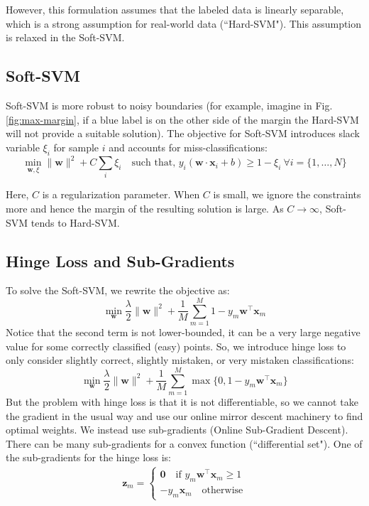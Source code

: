\documentclass[11pt]{article}
\begin{document}
However, this formulation assumes that the labeled data is linearly separable, which is a
strong assumption for real-world data (``Hard-SVM"). This assumption is relaxed in the Soft-SVM.

\subsection{Soft-SVM}
Soft-SVM is more robust to noisy boundaries (for example, imagine in
Fig. \ref{fig:max-margin}, if a blue label is on the other side of the margin the Hard-SVM will
not provide a suitable solution). The objective for Soft-SVM introduces slack variable $\xi_i$
for sample $i$ and accounts for miss-classifications:
$$\min_{\boldsymbol{w}, \xi} \| \boldsymbol{w} \|^2 + C \sum_i \xi_i \quad \text{such that, } y_i (\boldsymbol{w} \cdot \boldsymbol{x}_i + b) \geq 1 - \xi_i \ \forall i = \{ 1, \ldots, N \}$$

Here, $C$ is a regularization parameter. When $C$ is small, we ignore the constraints more and
hence the margin of the resulting solution is large. As $C \rightarrow \infty$, Soft-SVM tends
to Hard-SVM.

\subsection{Hinge Loss and Sub-Gradients}
To solve the Soft-SVM, we rewrite the objective as:
$$\min_{\boldsymbol{w}} \frac{\lambda}{2} \| \boldsymbol{w} \|^2 + \frac{1}{M} \sum_{m=1}^M 1 - y_m \boldsymbol{w}^{\top} \boldsymbol{x}_m$$
Notice that the second term is not lower-bounded, it can be a very large negative value for some
correctly classified (easy) points. So, we introduce hinge loss to only consider slightly correct,
slightly mistaken, or very mistaken classifications:
$$\min_{\boldsymbol{w}} \frac{\lambda}{2} \| \boldsymbol{w} \|^2 + \frac{1}{M} \sum_{m=1}^M \max \{0, 1 - y_m \boldsymbol{w}^{\top} \boldsymbol{x}_m \}$$
But the problem with hinge loss is that it is not differentiable, so we cannot take the gradient
in the usual way and use our online mirror descent machinery to find optimal weights. We instead
use sub-gradients (Online Sub-Gradient Descent). There can be many sub-gradients for a convex
function (``differential set"). One of the sub-gradients for the hinge loss is:
\begin{gather*}
    \boldsymbol{z}_m = 
    \begin{cases}
        \mathbf{0} \quad \text{if } y_m \boldsymbol{w}^{\top} \boldsymbol{x}_m \geq 1\\
        -y_m \boldsymbol{x}_m \quad \text{otherwise}
    \end{cases}
\end{gather*}
\end{document}
